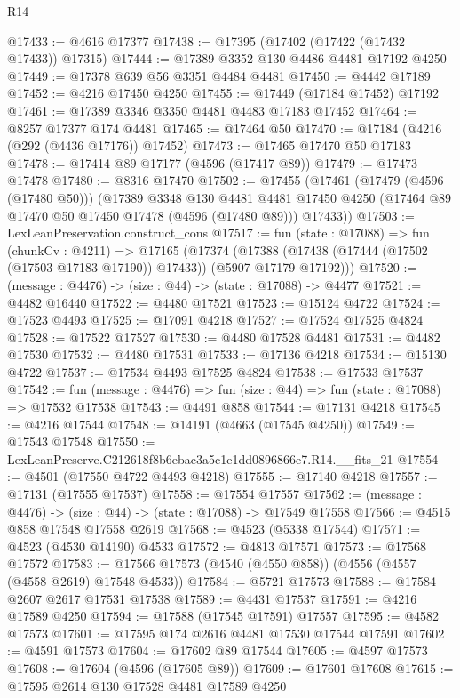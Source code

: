 \begin{lexlean}{R14}
\begin{coremodule}
@17433 := @4616 @17377
@17438 := @17395 (@17402 (@17422 (@17432 @17433)) @17315)
@17444 := @17389 @3352 @130 @4486 @4481 @17192 @4250
@17449 := @17378 @639 @56 @3351 @4484 @4481
@17450 := @4442 @17189
@17452 := @4216 @17450 @4250
@17455 := @17449 (@17184 @17452) @17192
@17461 := @17389 @3346 @3350 @4481 @4483 @17183 @17452
@17464 := @8257 @17377 @174 @4481
@17465 := @17464 @50
@17470 := @17184 (@4216 (@292 (@4436 @17176)) @17452)
@17473 := @17465 @17470 @50 @17183
@17478 := @17414 @89 @17177 (@4596 (@17417 @89))
@17479 := @17473 @17478
@17480 := @8316 @17470
@17502 := @17455
    (@17461
      (@17479 (@4596 (@17480 @50)))
      (@17389
        @3348
        @130
        @4481
        @4481
        @17450
        @4250
        (@17464 @89 @17470 @50 @17450 @17478 (@4596 (@17480 @89)))
        @17433))
@17503 := LexLeanPreservation.construct_cons
@17517 := fun (state : @17088) =>
  fun (chunkCv : @4211) =>
  @17165
    (@17374 (@17388 (@17438 (@17444 (@17502 (@17503 @17183 @17190)) @17433)) (@5907 @17179 @17192)))
@17520 := (message : @4476) -> (size : @44) -> (state : @17088) -> @4477
@17521 := @4482 @16440
@17522 := @4480 @17521
@17523 := @15124 @4722
@17524 := @17523 @4493
@17525 := @17091 @4218
@17527 := @17524 @17525 @4824
@17528 := @17522 @17527
@17530 := @4480 @17528 @4481
@17531 := @4482 @17530
@17532 := @4480 @17531
@17533 := @17136 @4218
@17534 := @15130 @4722
@17537 := @17534 @4493 @17525 @4824
@17538 := @17533 @17537
@17542 := fun (message : @4476) => fun (size : @44) => fun (state : @17088) => @17532 @17538
@17543 := @4491 @858
@17544 := @17131 @4218
@17545 := @4216 @17544
@17548 := @14191 (@4663 (@17545 @4250))
@17549 := @17543 @17548
@17550 := LexLeanPreserve.C212618f8b6ebac3a5c1e1dd0896866e7.R14.__fits_21
@17554 := @4501 (@17550 @4722 @4493 @4218)
@17555 := @17140 @4218
@17557 := @17131 (@17555 @17537)
@17558 := @17554 @17557
@17562 := (message : @4476) -> (size : @44) -> (state : @17088) -> @17549 @17558
@17566 := @4515 @858 @17548 @17558 @2619
@17568 := @4523 (@5338 @17544)
@17571 := @4523 (@4530 @14190) @4533
@17572 := @4813 @17571
@17573 := @17568 @17572
@17583 := @17566 @17573 (@4540 (@4550 @858)) (@4556 (@4557 (@4558 @2619) @17548 @4533))
@17584 := @5721 @17573
@17588 := @17584 @2607 @2617 @17531 @17538
@17589 := @4431 @17537
@17591 := @4216 @17589 @4250
@17594 := @17588 (@17545 @17591) @17557
@17595 := @4582 @17573
@17601 := @17595 @174 @2616 @4481 @17530 @17544 @17591
@17602 := @4591 @17573
@17604 := @17602 @89 @17544
@17605 := @4597 @17573
@17608 := @17604 (@4596 (@17605 @89))
@17609 := @17601 @17608
@17615 := @17595 @2614 @130 @17528 @4481 @17589 @4250

\end{coremodule}
\end{lexlean}
